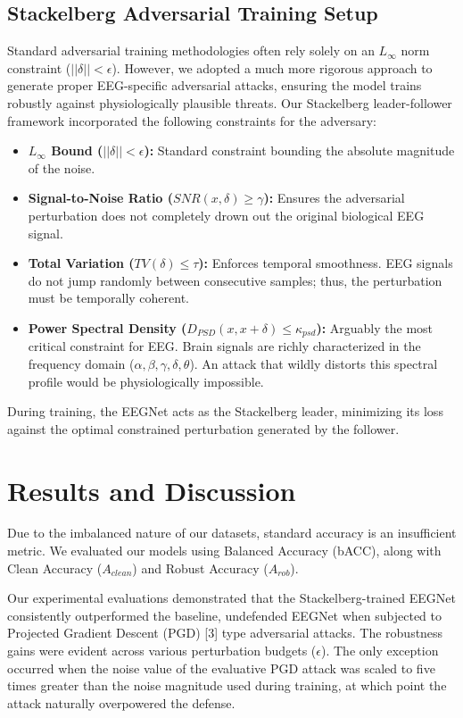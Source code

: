 \documentclass[10pt,a4paper,openright]{report}
\begin{document}
\section{Stackelberg Adversarial Training Setup}
Standard adversarial training methodologies often rely solely on an $L_\infty$ norm constraint ($||\delta|| < \epsilon$). However, we adopted a much more rigorous approach to generate proper EEG-specific adversarial attacks, ensuring the model trains robustly against physiologically plausible threats. Our Stackelberg leader-follower framework incorporated the following constraints for the adversary:
\begin{itemize}
\item \textbf{$L_\infty$ Bound ($||\delta|| < \epsilon$):} Standard constraint bounding the absolute magnitude of the noise.
\item \textbf{Signal-to-Noise Ratio ($SNR(x, \delta) \geq \gamma$):} Ensures the adversarial perturbation does not completely drown out the original biological EEG signal.
\item \textbf{Total Variation ($TV(\delta) \leq \tau$):} Enforces temporal smoothness. EEG signals do not jump randomly between consecutive samples; thus, the perturbation must be temporally coherent.
\item \textbf{Power Spectral Density ($D_{PSD}(x, x + \delta) \leq \kappa_{psd}$):} Arguably the most critical constraint for EEG. Brain signals are richly characterized in the frequency domain ($\alpha, \beta, \gamma, \delta, \theta$). An attack that wildly distorts this spectral profile would be physiologically impossible.
\end{itemize}
During training, the EEGNet acts as the Stackelberg leader, minimizing its loss against the optimal constrained perturbation generated by the follower.

\chapter{Results and Discussion}
Due to the imbalanced nature of our datasets, standard accuracy is an insufficient metric. We evaluated our models using Balanced Accuracy (bACC), along with Clean Accuracy ($A_{clean}$) and Robust Accuracy ($A_{rob}$).

Our experimental evaluations demonstrated that the Stackelberg-trained EEGNet consistently outperformed the baseline, undefended EEGNet when subjected to Projected Gradient Descent (PGD) [3] type adversarial attacks. The robustness gains were evident across various perturbation budgets ($\epsilon$). The only exception occurred when the noise value of the evaluative PGD attack was scaled to five times greater than the noise magnitude used during training, at which point the attack naturally overpowered the defense.
\end{document}

